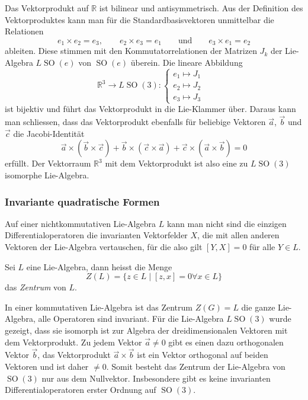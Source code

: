 \begin{beispiel}
Das Vektorprodukt auf $\mathbb{R}$ ist bilinear und antisymmetrisch.
Aus der Definition des Vektorproduktes kann man für die Standardbasisvektoren
unmittelbar die Relationen
\[
e_1\times e_2
=
e_3,
\qquad
e_2\times e_3
=
e_1
\qquad\text{und}\qquad
e_3\times e_1
=
e_2
\]
ableiten.
Diese stimmen mit den Kommutatorrelationen der Matrizen $J_k$ der
Lie-Algebra $L\operatorname{SO}(e)$ von $\operatorname{SO}(e)$ überein.
Die lineare Abbildung
\[
\mathbb{R}^3 \to L\operatorname{SO}(3):
\begin{cases}
e_1 \mapsto J_1&\\
e_2 \mapsto J_2&\\
e_3 \mapsto J_3&
\end{cases}
\]
ist bijektiv und
führt das Vektorprodukt in die Lie-Klammer über.
Daraus kann man schliessen, dass das Vektorprodukt ebenfalls für beliebige
Vektoren $\vec{a}$, $\vec{b}$ und $\vec{c}$ die Jacobi-Identität
\[
\vec{a}\times (\vec{b}\times\vec{c})
+
\vec{b}\times (\vec{c}\times\vec{a})
+
\vec{c}\times (\vec{a}\times\vec{b})
=
0
\]
erfüllt.
Der Vektorraum $\mathbb{R}^3$ mit dem Vektorprodukt ist also eine
zu $L\operatorname{SO}(3)$ isomorphe Lie-Algebra.
\end{beispiel}

%
%
\subsubsection{Invariante quadratische Formen}
Auf einer nichtkommutativen Lie-Algebra $L$ kann man nicht sind die einzigen
Differentialoperatoren die invarianten Vektorfelder $X$, die mit allen
anderen Vektoren der Lie-Algebra vertauschen, für die also gilt
$[Y,X]=0$ für alle $Y\in L$.

\begin{definition}
Sei $L$ eine Lie-Algebra, dann heisst die Menge
\[
Z(L)
=
\{z\in L\mid [z,x]=0\forall x\in L\}
\]
das {\em Zentrum} von $L$.
\end{definition}

In einer kommutativen Lie-Algebra ist das Zentrum $Z(G)=L$ die ganze
Lie-Algebra, alle Operatoren sind invariant.
Für die Lie-Algebra $L\operatorname{SO}(3)$ wurde gezeigt, dass sie
isomorph ist zur Algebra der dreidimensionalen Vektoren mit dem
Vektorprodukt.
Zu jedem Vektor $\vec{a}\ne 0$ gibt es einen dazu orthogonalen Vektor
$\vec{b}$, das Vektorprodukt $\vec{a}\times\vec{b}$ ist ein Vektor
orthogonal auf beiden Vektoren und ist daher $\ne 0$.
Somit besteht das Zentrum der Lie-Algebra von $\operatorname{SO}(3)$ nur
aus dem Nullvektor.
Insbesondere gibt es keine invarianten Differentialoperatoren erster
Ordnung auf $\operatorname{SO}(3)$.


